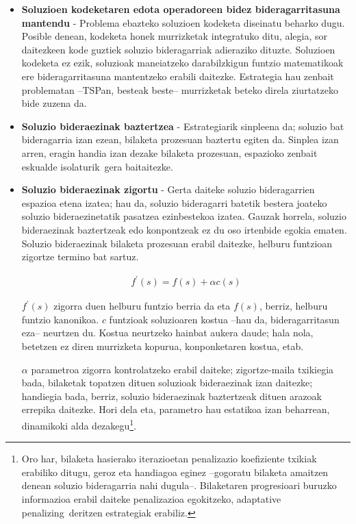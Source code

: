 \documentclass[eu]{ifirak}\usepackage[]{graphicx}\usepackage[]{color}
\newcommand{\zkk}{\guillemotleft}
\newcommand{\skk}{\guillemotright}
\begin{document}
\begin{itemize}
\item \textbf{Soluzioen kodeketaren edota operadoreen bidez bideragarritasuna mantendu} - Problema ebazteko soluzioen kodeketa diseinatu beharko dugu. Posible denean, kodeketa honek murrizketak integratuko ditu, alegia, sor daitezkeen kode guztiek soluzio bideragarriak adieraziko dituzte. Soluzioen kodeketa ez ezik, soluzioak maneiatzeko darabilzkigun funtzio matematikoak ere bideragarritasuna mantentzeko erabili daitezke. Estrategia hau zenbait problematan --TSPan, besteak beste-- murrizketak beteko direla ziurtatzeko bide zuzena da.

\item \textbf{Soluzio bideraezinak baztertzea} - Estrategiarik sinpleena da; soluzio bat bideragarria izan ezean, bilaketa prozesuan baztertu egiten da. Sinplea izan arren, eragin handia izan dezake bilaketa prozesuan, espazioko zenbait eskualde \zkk isolaturik\skk\ gera baitaitezke.

\item \textbf{Soluzio bideraezinak zigortu} - Gerta daiteke soluzio bideragarrien espazioa etena izatea; hau da, soluzio bideragarri batetik bestera joateko soluzio bideraezinetatik pasatzea ezinbestekoa izatea. Gauzak horrela, soluzio bideraezinak baztertzeak edo konpontzeak ez du oso irtenbide egokia ematen. Soluzio bideraezinak bilaketa prozesuan erabil daitezke, helburu funtzioan zigortze termino bat sartuz. 

\begin{align*}
f^\prime(s) = f(s) + \alpha c(s) 
\end{align*} 

$f^\prime(s)$ zigorra duen helburu funtzio berria da eta $f(s)$, berriz, helburu funtzio \zkk kanonikoa\skk. $c$ funtzioak soluzioaren kostua --hau da, bideragarritasun eza-- neurtzen du. Kostua neurtzeko hainbat aukera daude; hala nola, betetzen ez diren murrizketa kopurua, konponketaren kostua, etab. 

$\alpha$ parametroa zigorra kontrolatzeko erabil daiteke; zigortze-maila txikiegia bada, bilaketak topatzen dituen soluzioak bideraezinak izan daitezke; handiegia bada, berriz, soluzio bideraezinak baztertzeak dituen arazoak errepika daitezke. Hori dela eta, parametro hau estatikoa izan beharrean, dinamikoki alda dezakegu\footnote{Oro har, bilaketa hasierako iterazioetan penalizazio koefiziente txikiak erabiliko ditugu, geroz eta handiagoa eginez --gogoratu bilaketa amaitzen denean soluzio bideragarria nahi dugula--. Bilaketaren progresioari buruzko informazioa erabil daiteke penalizazioa egokitzeko, \zkk adaptative penalizing\skk\ deritzen estrategiak erabiliz.}.


\end{itemize}
\end{document}
